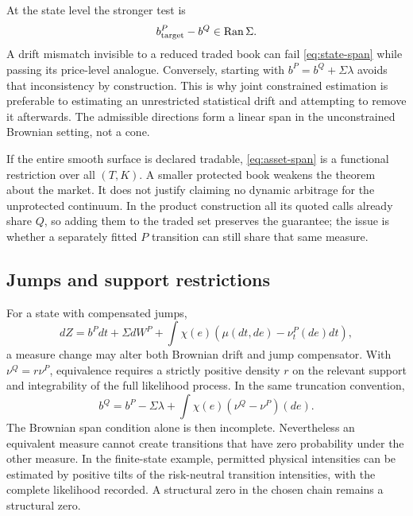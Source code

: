 \documentclass[11pt,a4paper]{article}
\numberwithin{equation}{section}
\theoremstyle{definition}\newtheorem{definition}[theorem]{Definition}
\theoremstyle{remark}\newtheorem{remark}[theorem]{Remark}
\newcommand{\Ran}{\operatorname{Ran}}\newcommand{\rank}{\operatorname{rank}}
\begin{document}
At the state level the stronger test is
\begin{equation}
 b^P_{\rm target}-b^Q\in\Ran\Sigma.
 \label{eq:state-span}
\end{equation}
A drift mismatch invisible to a reduced traded book can fail \eqref{eq:state-span} while passing its price-level analogue. Conversely, starting with $b^P=b^Q+\Sigma\lambda$ avoids that inconsistency by construction. This is why joint constrained estimation is preferable to estimating an unrestricted statistical drift and attempting to remove it afterwards. The admissible directions form a linear span in the unconstrained Brownian setting, not a cone.

If the entire smooth surface is declared tradable, \eqref{eq:asset-span} is a functional restriction over all $(T,K)$. A smaller protected book weakens the theorem about the market. It does not justify claiming no dynamic arbitrage for the unprotected continuum. In the product construction all its quoted calls already share $Q$, so adding them to the traded set preserves the guarantee; the issue is whether a separately fitted $P$ transition can still share that same measure.

\subsection{Jumps and support restrictions}
For a state with compensated jumps,
\[
 dZ=b^Pdt+\Sigma dW^P+\int\chi(e)(\mu(dt,de)-\nu^P_t(de)dt),
\]
a measure change may alter both Brownian drift and jump compensator. With $\nu^Q=r\nu^P$, equivalence requires a strictly positive density $r$ on the relevant support and integrability of the full likelihood process. In the same truncation convention,
\begin{equation}
 b^Q=b^P-\Sigma\lambda+\int\chi(e)(\nu^Q-\nu^P)(de).
 \label{eq:jump-girsanov}
\end{equation}
The Brownian span condition alone is then incomplete. Nevertheless an equivalent measure cannot create transitions that have zero probability under the other measure. In the finite-state example, permitted physical intensities can be estimated by positive tilts of the risk-neutral transition intensities, with the complete likelihood recorded. A structural zero in the chosen chain remains a structural zero.
\end{document}
